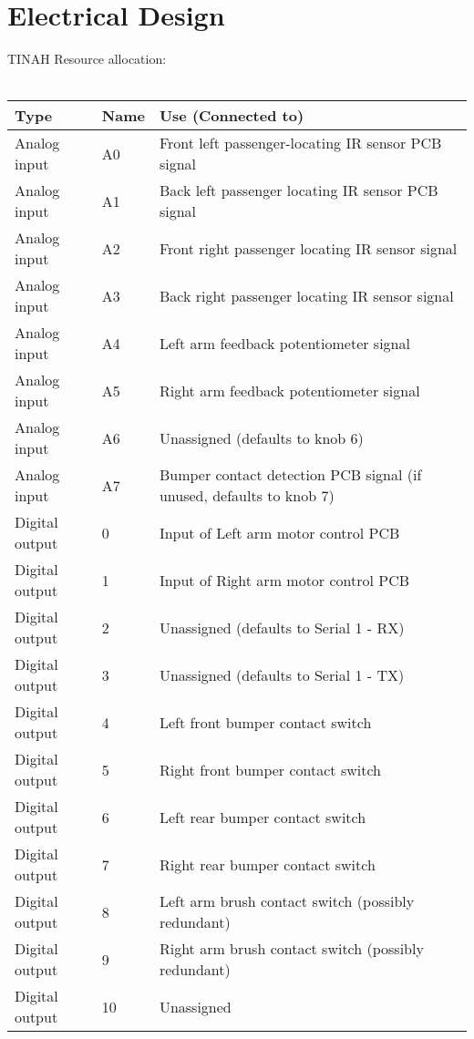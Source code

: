 \documentclass[12pt]{article}
\begin{document}
\section{Electrical Design}
\par TINAH Resource allocation: \\ \\
\begin{longtable}{| m{7em} | m{3em} | m{25em} |}
\hline
Type & Name & Use (Connected to) \\
\hline
Analog input & A0 & Front left passenger-locating IR sensor PCB signal \\
\hline
Analog input & A1 & Back left passenger locating IR sensor PCB signal \\
\hline
Analog input & A2 & Front right passenger locating IR sensor signal \\
\hline
Analog input & A3 & Back right passenger locating IR sensor signal \\
\hline
Analog input & A4 & Left arm feedback potentiometer signal \\
\hline
Analog input & A5 & Right arm feedback potentiometer signal \\
\hline
Analog input & A6 & Unassigned (defaults to knob 6) \\
\hline
Analog input & A7 & Bumper contact detection PCB signal (if unused, defaults to knob 7) \\
\hline
Digital output & 0 & Input of Left arm motor control PCB \\
\hline
Digital output & 1 & Input of Right arm motor control PCB \\
\hline
Digital output & 2 & Unassigned (defaults to Serial 1 - RX) \\
\hline
Digital output & 3 & Unassigned (defaults to Serial 1 - TX) \\
\hline
Digital output & 4 & Left front bumper contact switch \\
\hline
Digital output & 5 & Right front bumper contact switch \\
\hline
Digital output & 6 & Left rear bumper contact switch \\
\hline
Digital output & 7 & Right rear bumper contact switch \\
\hline
Digital output & 8 & Left arm brush contact switch (possibly redundant) \\
\hline
Digital output & 9 & Right arm brush contact switch (possibly redundant) \\
\hline
Digital output & 10 & Unassigned \\

\end{longtable}
\end{document}
